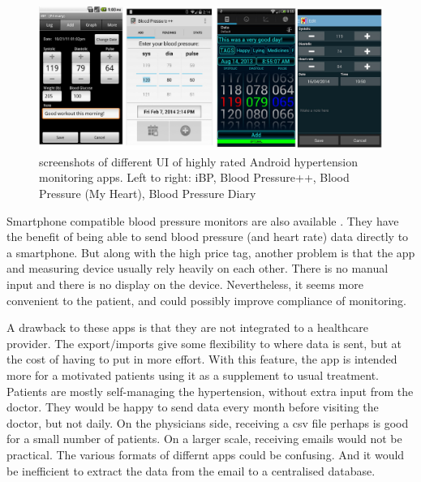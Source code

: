 \documentclass[11pt]{article}
\begin{document}
\begin{figure}[ht]
\begin{center}
\includegraphics[scale=0.3]{AppsUI}
\caption{screenshots of different UI of highly rated Android hypertension monitoring apps.  Left to right: iBP\cite{UIiBP}, Blood Pressure++\cite{UIbppp}, Blood Pressure (My Heart)\cite{UIbpmh}, Blood Pressure Diary\cite{UIbpd}}
\label{fig:AppsUI}
\end{center}
\end{figure}


Smartphone compatible blood pressure monitors are also available \cite{app2} \cite{app3}.  They have the benefit of being able to send blood pressure (and heart rate) data directly to a smartphone.  But along with the high price tag, another problem is that the app and measuring device usually rely heavily on each other.  There is no manual input and there is no display on the device. Nevertheless, it seems more convenient to the patient, and could possibly improve compliance of monitoring.  

A drawback to these apps is that they are not integrated to a healthcare provider.  The export/imports give some flexibility to where data is sent, but at the cost of having to put in more effort.  With this feature, the app is intended more for a motivated patients using it as a supplement to usual treatment. Patients are mostly self-managing the hypertension, without extra input from the doctor.  They would be happy to send data every month before visiting the doctor, but not daily.  On the physicians side, receiving a csv file perhaps is good for a small number of patients. On a larger scale, receiving emails would not be practical. The various formats of differnt apps could be confusing. And it would be inefficient to extract the data from the email to a centralised database.
\end{document}
